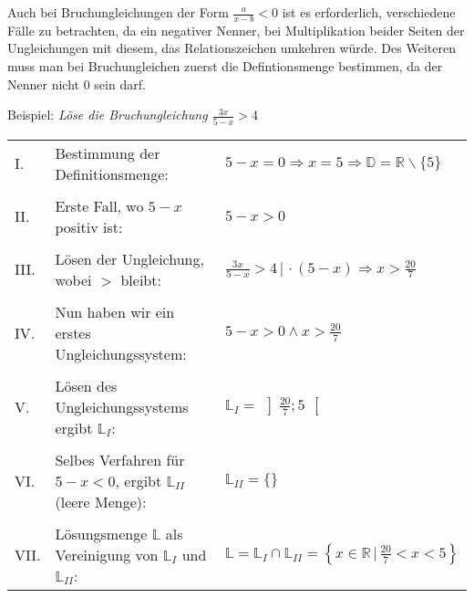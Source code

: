 
Auch bei Bruchungleichungen der Form $\frac{a}{x - b} < 0$ ist es erforderlich, verschiedene F\"{a}lle zu betrachten, da ein negativer Nenner, bei Multiplikation beider Seiten der Ungleichungen mit diesem, das Relationszeichen umkehren w\"{u}rde. Des Weiteren muss man bei Bruchungleichen zuerst die Defintionsmenge bestimmen, da der Nenner nicht 0 sein darf.

Beispiel: \emph{L\"{o}se die Bruchungleichung $\frac{3x}{5 - x} > 4$}

\begin{table}[h!]
	\begin{tabular}{p{0.3cm} p{8.5cm} l}
		I. & Bestimmung der Definitionsmenge: & $5 - x = 0 \Rightarrow x = 5 \Rightarrow \mathbb{D} = \mathbb{R} \backslash \{5\}$
		\\ && \\
		II. & Erste Fall, wo $5 - x$ positiv ist: & $5 - x > 0$
		\\ && \\
		III. & L\"{o}sen der Ungleichung, wobei $>$ bleibt: & $\frac{3x}{5 - x} > 4 \,|\, \cdot (5 - x) \Rightarrow x > \frac{20}{7}$
		\\ && \\
		IV. & Nun haben wir ein erstes Ungleichungssystem: & $5 - x > 0 \land x > \frac{20}{7}$
		\\ && \\
		V. & L\"{o}sen des Ungleichungssystems ergibt $\mathbb{L}_{I}$: & $\mathbb{L}_{I} = \,\left]\frac{20}{7};5\,\right[$
		\\ && \\
		VI. & Selbes Verfahren f\"{u}r $5 - x < 0$, ergibt $\mathbb{L}_{II}$ (leere Menge): & $\mathbb{L}_{II} = \{ \}$
		\\ && \\
		VII. & L\"{o}sungsmenge $\mathbb{L}$ als Vereinigung von $\mathbb{L}_{I}$ und $\mathbb{L}_{II}$: & $\mathbb{L} = \mathbb{L}_I \cap \mathbb{L}_{II} = \left\{x \in \mathbb{R} \,|\, \frac{20}{7} < x < 5 \right\}$
	\end{tabular}
\end{table}

